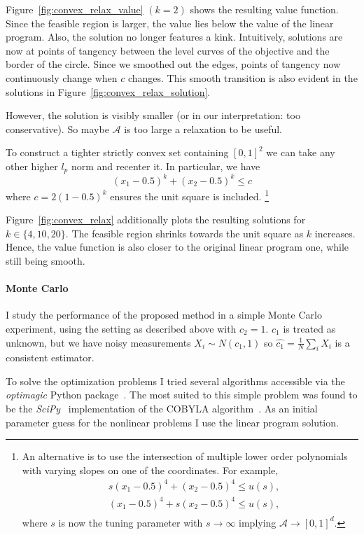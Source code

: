 \documentclass[12pt,a4paper,english]{article} %
\numberwithin{equation}{section}
\theoremstyle{definition}
\theoremstyle{remark}
\theoremstyle{plain}
\begin{document}
Figure~\ref{fig:convex_relax_value} $(k=2)$ shows the resulting value function.
Since the feasible region is larger, the value lies below the value of the linear program.
Also, the solution no longer features a kink.
Intuitively, solutions are now at points of tangency between the level curves of the objective and the border of the circle.
Since we smoothed out the edges, points of tangency now continuously change when $c$ changes.
This smooth transition is also evident in the solutions in Figure~\ref{fig:convex_relax_solution}.

However, the solution is visibly smaller (or in our interpretation: too conservative).
So maybe $\mathcal{A}$ is too large a relaxation to be useful.

To construct a tighter strictly convex set containing $[0,1]^2$ we can take any other higher $l_p$ norm and recenter it.
In particular, we have
\begin{equation*}
	(x_1-0.5)^k + (x_2-0.5)^k \leq c
\end{equation*}
where $c = 2(1-0.5)^k$ ensures the unit square is included.
\footnote{An alternative is to use the intersection of multiple lower order polynomials with varying slopes on one of the coordinates. For example,
\begin{align}
	& s(x_1 - 0.5)^4 + (x_2 - 0.5)^4 \leq u(s), \\
	& (x_1 - 0.5)^4 + s(x_2 - 0.5)^4 \leq u(s), \\
\end{align}
where $s$ is now the tuning parameter with $s\to\infty$ implying $\mathcal{A} \to [0,1]^d$.}

Figure~\ref{fig:convex_relax} additionally plots the resulting solutions for $k\in\{4, 10, 20\}$.
The feasible region shrinks towards the unit square as $k$ increases.
Hence, the value function is also closer to the original linear program one, while still being smooth.

\paragraph{Monte Carlo}
I study the performance of the proposed method in a simple Monte Carlo experiment, using the setting as described above with $c_2=1$.
$c_1$ is treated as unknown, but we have noisy measurements $X_i \sim N(c_1, 1)$ so $\hat{c_1} = \frac{1}{N}\sum_i X_i$ is a consistent estimator.

To solve the optimization problems I tried several algorithms accessible via the \textit{optimagic} Python package~\citep{Gabler2024}.
The most suited to this simple problem was found to be the \textit{SciPy}~\citep{scipy} implementation of the COBYLA algorithm~\citep{cobyla_powell1994direct}.
As an initial parameter guess for the nonlinear problems I use the linear program solution.
\end{document}
